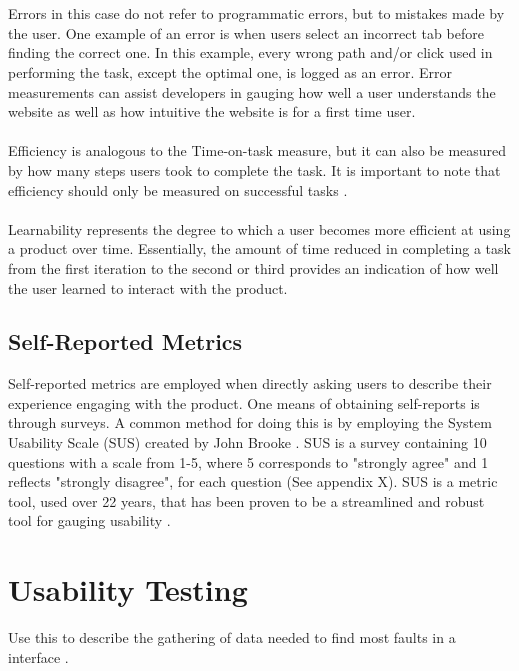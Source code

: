 \\\\
Errors in this case do not refer to programmatic errors, but to mistakes made by the user. One example of an error is when users select an incorrect tab before finding the correct one. In this example, every wrong path and/or click used in performing the task, except the optimal one, is logged as an error. Error measurements can assist developers in gauging how well a user understands the website as well as how intuitive the website is for a first time user. 
\\\\
Efficiency is analogous to the Time-on-task measure, but it can also be measured by how many steps users took to complete the task. It is important to note that efficiency should only be measured on successful tasks \cite{tullis_albert_2011}.
\\\\
Learnability represents the degree to which a user becomes more efficient at using a product over time. Essentially, the amount of time reduced in completing a task from the first iteration to the second or third provides an indication of how well the user learned to interact with the product. 
\subsection{Self-Reported Metrics}
Self-reported metrics are employed when directly asking users to describe their experience engaging with the product. One means of obtaining self-reports is through surveys. A common method for doing this is by employing the System Usability Scale (SUS) created by John Brooke \cite{tullis_albert_2011} \cite{brooke1996sus}. SUS is a survey containing 10 questions with a scale from 1-5, where 5 corresponds to "strongly agree" and 1 reflects "strongly disagree", for each question (See appendix X). SUS is a metric tool, used over 22 years, that has been proven to be a streamlined and robust tool for gauging usability \cite{brooke1996sus}. 
\section{Usability Testing}
 Use this to describe the gathering of data needed to find most faults in a interface \cite{tullis_albert_2011}. 

